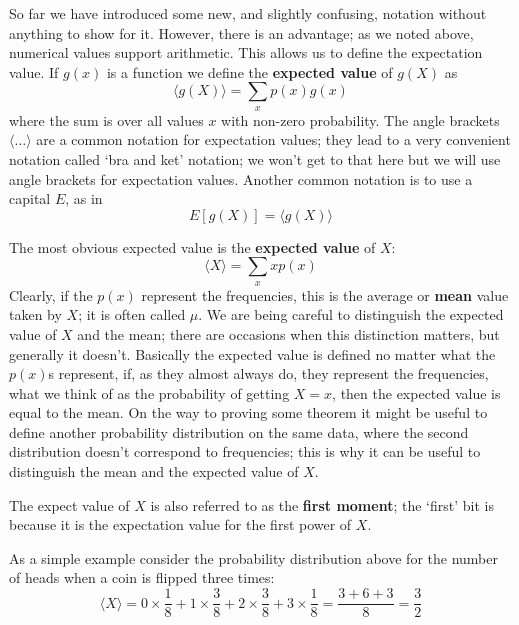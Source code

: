 \documentclass[11pt,a4paper]{scrartcl}
\begin{document}
So far we have introduced some new, and slightly confusing, notation
without anything to show for it. However, there is an advantage; as we
noted above, numerical values support arithmetic. This allows us to
define the expectation value. If $g(x)$ is a function we define the
\textbf{expected value} of $g(X)$ as
\begin{equation}
\langle g(X)\rangle = \sum_x p(x)g(x)
\end{equation}
where the sum is over all values $x$ with non-zero probability. The
angle brackets $\langle \ldots \rangle$ are a common notation for
expectation values; they lead to a very convenient notation called
\lq{}bra and ket\rq{} notation; we won't get to that here but we will
use angle brackets for expectation values. Another common notation is to use a capital $E$, as in
\begin{equation}
E[g(X)]=\langle g(X)\rangle
\end{equation}

The most obvious expected value is the \textbf{expected value} of $X$:
\begin{equation}
\langle X \rangle =  \sum_x x p(x)
\end{equation}
Clearly, if the $p(x)$ represent the frequencies, this is the average
or \textbf{mean} value taken by $X$; it is often called $\mu$. We are
being careful to distinguish the expected value of $X$ and the mean;
there are occasions when this distinction matters, but generally it
doesn't. Basically the expected value is defined no matter what the
$p(x)$s represent, if, as they almost always do, they represent the
frequencies, what we think of as the probability of getting $X=x$,
then the expected value is equal to the mean. On the way to proving
some theorem it might be useful to define another probability
distribution on the same data, where the second distribution doesn't
correspond to frequencies; this is why it can be useful to distinguish
the mean and the expected value of $X$.

The expect value of $X$ is also referred to as the \textbf{first
  moment}; the \lq{}first\rq{} bit is because it is the expectation
value for the first power of $X$.

As a simple example consider the probability distribution above for
the number of heads when a coin is flipped three times:
\begin{equation}
\langle X\rangle =0\times\frac{1}{8}+1\times\frac{3}{8}+2\times\frac{3}{8}+3\times \frac{1}{8}=\frac{3+6+3}{8}=\frac{3}{2}
\end{equation}
\end{document}
